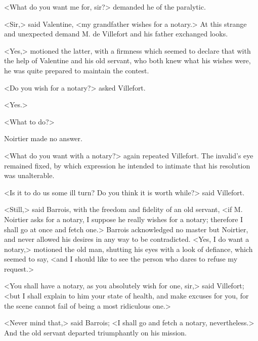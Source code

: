  <What do you want me for, sir?> demanded he of the paralytic. 

 <Sir,> said Valentine, <my grandfather wishes for a notary.> At this strange and unexpected demand M. de Villefort and his father exchanged looks. 

 <Yes,> motioned the latter, with a firmness which seemed to declare that with the help of Valentine and his old servant, who both knew what his wishes were, he was quite prepared to maintain the contest. 

 <Do you wish for a notary?> asked Villefort. 

 <Yes.> 

 <What to do?> 

 Noirtier made no answer. 

 <What do you want with a notary?> again repeated Villefort. The invalid's eye remained fixed, by which expression he intended to intimate that his resolution was unalterable. 

 <Is it to do us some ill turn? Do you think it is worth while?> said Villefort. 

 <Still,> said Barrois, with the freedom and fidelity of an old servant, <if M. Noirtier asks for a notary, I suppose he really wishes for a notary; therefore I shall go at once and fetch one.> Barrois acknowledged no master but Noirtier, and never allowed his desires in any way to be contradicted.  <Yes, I do want a notary,> motioned the old man, shutting his eyes with a look of defiance, which seemed to say, <and I should like to see the person who dares to refuse my request.> 

 <You shall have a notary, as you absolutely wish for one, sir,> said Villefort; <but I shall explain to him your state of health, and make excuses for you, for the scene cannot fail of being a most ridiculous one.> 

 <Never mind that,> said Barrois; <I shall go and fetch a notary, nevertheless.> And the old servant departed triumphantly on his mission. 